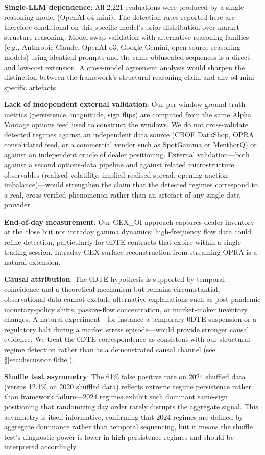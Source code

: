 \noindent\textbf{Single-LLM dependence}: All 2{,}221 evaluations were
produced by a single reasoning model (OpenAI o4-mini). The detection
rates reported here are therefore conditional on this specific model's
prior distribution over market-structure reasoning. Model-swap
validation with alternative reasoning families
(e.g., Anthropic Claude, OpenAI o3, Google Gemini, open-source
reasoning models) using identical prompts and the same obfuscated
sequences is a direct and low-cost extension. A cross-model agreement
analysis would sharpen the distinction between the framework's
structural-reasoning claim and any o4-mini-specific artefacts.

\noindent\textbf{Lack of independent external validation}: Our per-window
ground-truth metrics (persistence, magnitude, sign flips) are computed
from the same Alpha Vantage options feed used to construct the windows.
We do not cross-validate detected regimes against an independent
data source (CBOE DataShop, OPRA consolidated feed, or a commercial
vendor such as SpotGamma or MenthorQ) or against an independent oracle
of dealer positioning. External validation---both against a second
options-data pipeline and against related microstructure observables
(realised volatility, implied-realised spread, opening auction
imbalance)---would strengthen the claim that the detected regimes
correspond to a real, cross-verified phenomenon rather than an artefact
of any single data provider.

\noindent\textbf{End-of-day measurement}: Our GEX\_OI approach captures
dealer inventory at the close but not intraday gamma dynamics; high-frequency
flow data could refine detection, particularly for 0DTE contracts that
expire within a single trading session. Intraday GEX surface reconstruction
from streaming OPRA is a natural extension.

\noindent\textbf{Causal attribution}: The 0DTE hypothesis is supported by
temporal coincidence and a theoretical mechanism but remains
circumstantial; observational data cannot exclude alternative explanations
such as post-pandemic monetary-policy shifts, passive-flow concentration,
or market-maker inventory changes. A natural experiment---for instance a
temporary 0DTE suspension or a regulatory halt during a market stress
episode---would provide stronger causal evidence. We treat the 0DTE
correspondence as consistent with our structural-regime detection rather
than as a demonstrated causal channel (see \S\ref{sec:discussion:0dte}).

\noindent\textbf{Shuffle test asymmetry}: The 61\% false positive rate on
2024 shuffled data (versus 12.1\% on 2020 shuffled data) reflects extreme
regime persistence rather than framework failure---2024 regimes exhibit
such dominant same-sign positioning that randomizing day order rarely
disrupts the aggregate signal. This asymmetry is itself informative,
confirming that 2024 regimes are defined by aggregate dominance rather
than temporal sequencing, but it means the shuffle test's diagnostic
power is lower in high-persistence regimes and should be interpreted
accordingly.

